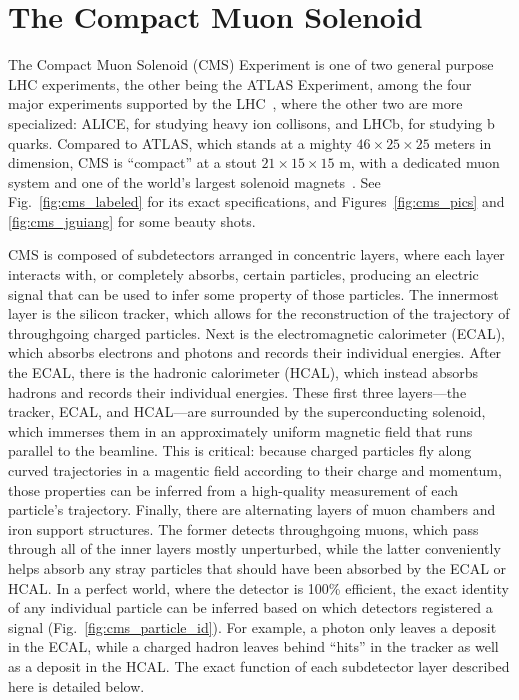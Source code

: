 \section{The Compact Muon Solenoid}
The Compact Muon Solenoid (CMS) Experiment is one of two general purpose LHC experiments, the other being the ATLAS\footnotemark{} Experiment, among the four major experiments supported by the LHC~\cite{LHCWeb}, where the other two are more specialized: ALICE, for studying heavy ion collisons, and LHCb, for studying b quarks. 
Compared to ATLAS, which stands at a mighty $46\times25\times25$ meters in dimension, CMS is ``compact'' at a stout $21\times15\times15$ m, with a dedicated muon system and one of the world's largest solenoid magnets~\cite{ATLASWeb, CMSWeb}. 
See Fig.~\ref{fig:cms_labeled} for its exact specifications, and Figures~\ref{fig:cms_pics} and \ref{fig:cms_jguiang} for some beauty shots. 

CMS is composed of subdetectors arranged in concentric layers, where each layer interacts with, or completely absorbs, certain particles, producing an electric signal that can be used to infer some property of those particles. 
The innermost layer is the silicon tracker, which allows for the reconstruction of the trajectory of throughgoing charged particles. 
Next is the electromagnetic calorimeter (ECAL), which absorbs electrons and photons and records their individual energies. 
After the ECAL, there is the hadronic calorimeter (HCAL), which instead absorbs hadrons and records their individual energies. 
These first three layers---the tracker, ECAL, and HCAL---are surrounded by the superconducting solenoid, which immerses them in an approximately uniform magnetic field that runs parallel to the beamline. 
This is critical: because charged particles fly along curved trajectories in a magentic field according to their charge and momentum, those properties can be inferred from a high-quality measurement of each particle's trajectory. 
Finally, there are alternating layers of muon chambers and iron support structures. 
The former detects throughgoing muons, which pass through all of the inner layers mostly unperturbed, while the latter conveniently helps absorb any stray particles that should have been absorbed by the ECAL or HCAL. 
In a perfect world, where the detector is 100\% efficient, the exact identity of any individual particle can be inferred based on which detectors registered a signal (Fig.~\ref{fig:cms_particle_id}). 
For example, a photon only leaves a deposit in the ECAL, while a charged hadron leaves behind ``hits'' in the tracker as well as a deposit in the HCAL. 
The exact function of each subdetector layer described here is detailed below.

